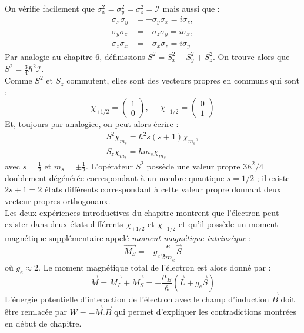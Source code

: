 \documentclass	[11pt, a4paper, openany]{book}
\begin{document}
	On vérifie facilement que $\sigma_x^2 = \sigma_y^2 = \sigma_z^2 = \mathcal{I}$ mais
	aussi que :
	\begin{equation}
	\begin{array}{lll}
	\sigma_x\sigma_y &= -\sigma_y\sigma_x = i\sigma_z,\\
	\sigma_y\sigma_z &= -\sigma_z\sigma_y = i\sigma_x,\\
	\sigma_z\sigma_x &= -\sigma_x\sigma_z = i\sigma_y
	\end{array}
	\end{equation}
	Par analogie au chapitre 6, définissions $S^2 = S_x^2 + S_y^2 + S_z^2$. On trouve
	alors que $S^2 = \frac{3}{4}\hbar^2\mathcal{I}$.\\
	
	Comme $S^2$ et $S_z$ commutent, elles sont des vecteurs propres en communs qui sont :
	\begin{equation}
	\chi_{+1/2} = \left(\begin{array}{cc}
	1\\
	0
	\end{array}\right),\ \ \ \ \ \	\chi_{-1/2} = \left(\begin{array}{cc}
	0\\
	1
	\end{array}\right)
	\end{equation}
	Et, toujours par analogiee, on peut alors écrire :
	\begin{eqnarray}
	S^2\chi_{m_s} = \hbar^2 s(s+1)\chi_{m_s},\\
	S_z\chi_{m_s} = \hbar m_s\chi_{m_s}
	\end{eqnarray}
	avec $s = \frac{1}{2}$ et $m_s = \pm \frac{1}{2}$. L'opérateur $S^2$ possède une 
	valeur propre $3\hbar^2/4$ doublement dégénérée correspondant à un nombre quantique
	$s=1/2$ ; il existe $2s+1=2$ états différents correspondant à cette valeur propre 
	donnant deux vecteur propres orthogonaux.\\
	
	Les deux expériences introductives du chapitre montrent que l'électron peut exister
	dans deux états différents $\chi_{+1/2}$ et $\chi_{-1/2}$ et qu'il possède un 
	moment magnétique supplémentaire appelé \textit{moment magnétique intrinsèque} :
	\begin{equation}
	\vec{M_S} = -g_e\frac{e}{2m_e}\vec{S}
	\end{equation}
	où $g_e \approx 2$. Le moment magnétique total de l'électron est alors donné par :
	\begin{equation}
	\vec{M} = \vec{M_L}+\vec{M_S} = -\frac{\mu_B}{\hbar}(\vec{L}+g_e\vec{S})
	\end{equation}
	L'énergie potentielle d'interaction de l'électron avec le champ d'induction $\vec{B}$
	doit être remlacée par $W = -\vec{M}.\vec{B}$ qui permet d'expliquer les 
	contradictions montrées en début de chapitre.
	
\end{document}
